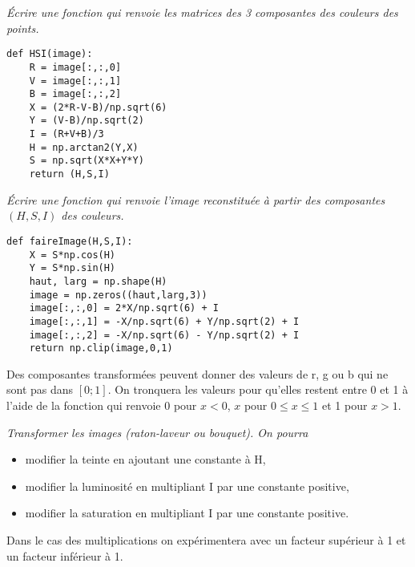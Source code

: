 \begin{Exercise}\it Écrire une fonction  qui renvoie les matrices des 3 composantes des couleurs des points.
\end{Exercise}
\begin{Answer}
\begin{lstlisting}
def HSI(image):
    R = image[:,:,0]
    V = image[:,:,1]
    B = image[:,:,2]
    X = (2*R-V-B)/np.sqrt(6)
    Y = (V-B)/np.sqrt(2)
    I = (R+V+B)/3
    H = np.arctan2(Y,X)
    S = np.sqrt(X*X+Y*Y)
    return (H,S,I)
\end{lstlisting}
\end{Answer}
\begin{Exercise}\it Écrire une fonction  qui renvoie l'image reconstituée à partir des composantes $(H,S,I)$ des couleurs.

\end{Exercise}
\begin{Answer}
\begin{lstlisting}
def faireImage(H,S,I):
    X = S*np.cos(H)
    Y = S*np.sin(H)
    haut, larg = np.shape(H)
    image = np.zeros((haut,larg,3))
    image[:,:,0] = 2*X/np.sqrt(6) + I
    image[:,:,1] = -X/np.sqrt(6) + Y/np.sqrt(2) + I
    image[:,:,2] = -X/np.sqrt(6) - Y/np.sqrt(2) + I
    return np.clip(image,0,1)
\end{lstlisting}
\end{Answer}
\medskip
Des composantes transformées peuvent donner des valeurs de r, g ou b qui ne sont pas dans $[0;1]$. On tronquera les valeurs pour qu'elles restent entre 0 et 1 à l'aide de la fonction  qui renvoie 0 pour $x < 0$, $x$ pour $0\le x \le 1$ et 1 pour $x> 1$.
\begin{Exercise}\it Transformer les images (raton-laveur ou bouquet). On pourra
\begin{itemize}
\item modifier la teinte en ajoutant une constante à H,
\item modifier la luminosité en multipliant I par une constante positive,
\item modifier la saturation en multipliant I par une constante positive.
\end{itemize}

Dans le cas des multiplications on expérimentera avec un facteur supérieur à 1 et un facteur inférieur à 1.
\end{Exercise}
\begin{Answer}
\end{Answer}
